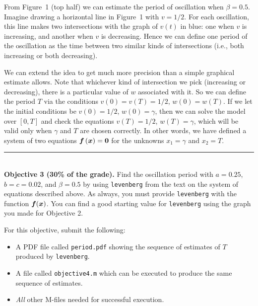 \documentclass[11pt,letterpaper]{article}
\begin{document}
From Figure~1 (top half) we can estimate the period of oscillation when $\beta=0.5$. Imagine drawing a horizontal line in Figure~1 with $v=1/2$. For each oscillation, this line makes two intersections with the graph of $v(t)$ in blue: one when $v$ is increasing, and another when $v$ is decreasing. Hence we can define one period of the oscillation as the time between two similar kinds of intersections (i.e., both increasing or both decreasing). 

We can extend the idea to get much more precision than a simple graphical estimate allows. Note that 
whichever kind of intersection we pick (increasing or decreasing), there is a particular value of $w$ associated with it. So we can define the period $T$ via the conditions $v(0)=v(T)=1/2$, $w(0)=w(T)$. If we let the initial conditions be $v(0)=1/2$, $w(0)=\gamma$, then we can solve the model over $[0,T]$ and check the equations $v(T)=1/2$, $w(T)=\gamma$, which will be valid only when $\gamma$ and $T$ are chosen correctly. In other words, we have defined a system of two equations $\bm{f}\,(\bm{x})=\bm{0}$ for the unknowns $x_1 = \gamma$ and $x_2 = T$. 

\hfill \rule{4in}{1pt} \hspace*{\fill}\\

\noindent \textbf{Objective 3 (30\% of the grade).} Find the oscillation period with $a=0.25$, $b=c=0.02$, and $\beta=0.5$ by using \texttt{levenberg} from the text on the system of equations described above. As always, you must provide \texttt{levenberg} with the function $\bm{f}(\bm{x})$. 
You can find a good starting value for \texttt{levenberg} using the graph you made for Objective 2.

For this objective, submit the following:
\begin{itemize}
\item A PDF file called \texttt{period.pdf} showing the sequence of estimates of $T$ produced by \texttt{levenberg}.  
\item A file called \texttt{objective4.m} which can be executed to produce the same sequence of estimates.
\item \textit{All} other M-files needed for successful execution.
\end{itemize}
\end{document}
